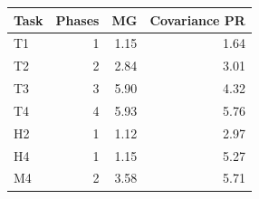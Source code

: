 \begin{tabular}{lrrr}
\toprule
Task & Phases & MG & Covariance PR \\
\midrule
T1 & 1 & 1.15 & 1.64 \\
T2 & 2 & 2.84 & 3.01 \\
T3 & 3 & 5.90 & 4.32 \\
T4 & 4 & 5.93 & 5.76 \\
H2 & 1 & 1.12 & 2.97 \\
H4 & 1 & 1.15 & 5.27 \\
M4 & 2 & 3.58 & 5.71 \\
\bottomrule
\end{tabular}
